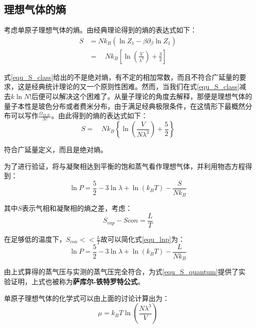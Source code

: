 \documentclass[UTF8]{ctexart}
\begin{document}
	\subsection{理想气体的熵}
	考虑单原子理想气体的熵。由经典理论得到的熵的表达式如下：
	\begin{equation}
	\begin{aligned}
S&=N k_{B}\left(\ln Z_{1}-\beta \partial_{\beta} \ln Z_{1}\right)\\
&=\quad N k_{B}\left[\ln \left(\frac{V}{\lambda^{3}}\right)+\frac{3}{2}\right]
	\end{aligned}\label{equ_S_class}
\end{equation}

\noindent 式\ref{equ_S_class}给出的不是绝对熵，有不定的相加常数，而且不符合广延量的要求，这是经典统计理论的又一个原则性困难。然而，当我们在式\ref{equ_S_class}减去$ k\ln N! $后便可以解决这个困难了。从量子理论的角度去解释，那便是理想气体的量子本性是玻色分布或者费米分布，由于满足经典极限条件，在这情形下最概然分布可以写作$ \frac{\Omega_{M.B.}}{N!} $。由此得到的熵的表达式如下：
	\begin{equation}
	S=\quad N k_{B}\left\{\ln \left(\frac{V}{N \lambda^{3}}\right)+\frac{5}{2}\right\}\label{equ_S_quantum}
	\end{equation}

\noindent 符合广延量定义，而且是绝对熵。

	为了进行验证，将与凝聚相达到平衡的饱和蒸气看作理想气体，并利用物态方程得到：
	\begin{equation}
\ln P=\frac{5}{2}-3 \ln \lambda+\ln \left(k_{B} T\right)-\frac{S}{N k_{B}}\label{equ_lnp}
\end{equation}

\noindent 其中$ S $表示气相和凝聚相的熵之差，考虑：
	\begin{equation}
		S_{vap}-S{con}=\frac{L}{T}
	\end{equation}
	
\noindent 在足够低的温度下，$ S_{con}<<\frac{L}{T} $故可以简化式\ref{equ_lnp}为：
	\begin{equation}
		\ln P=\frac{5}{2}-3 \ln \lambda+\ln \left(k_{B} T\right)-\frac{L}{N k_{B}}
	\end{equation}
	
\noindent 由上式算得的蒸气压与实测的蒸气压完全符合，为式\ref{equ_S_quantum}提供了实验证明，上式也被称为\textbf{萨库尔-铁特罗特公式}。

	单原子理想气体的化学式可以由上面的讨论计算出为：
	\begin{equation}
	\mu=k_{B} T \ln \left(\frac{N \lambda^{3}}{V}\right)
	\end{equation}
	
\end{document}
